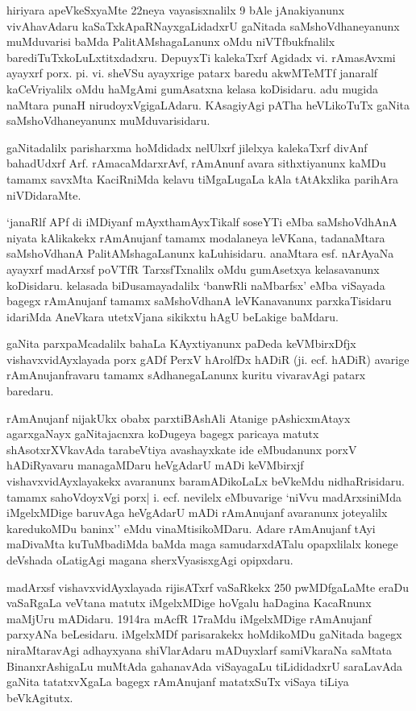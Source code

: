 hiriyara apeVkeSxyaMte {\rm 22}neya vayasisxnalilx {\rm 9} bAle jAnakiyanunx vivAhavAdaru kaSaTxkApaRNayxgaLidadxrU gaNitada saMshoVdhaneyanunx muMduvarisi baMda PalitAMshagaLanunx oMdu niVTfbukfnalilx  barediTuTxkoLuLxtitxdadxru. DepuyxTi kalekaTxrf Agidadx vi. rAmasAvxmi ayayxrf porx. pi. vi. sheVSu ayayxrige patarx baredu akwMTeMTf janaralf kaCeVriyalilx oMdu haMgAmi gumAsatxna kelasa koDisidaru. adu mugida naMtara punaH nirudoyxVgigaLAdaru. KAsagiyAgi pATha heVLikoTuTx gaNita saMshoVdhaneyanunx muMduvarisidaru.

gaNitadalilx parisharxma hoMdidadx nelUlxrf jilelxya kalekaTxrf divAnf bahadUdxrf Arf. rAmacaMdarxrAvf, rAmAnunf avara sithxtiyanunx kaMDu tamamx savxMta KaciRniMda kelavu tiMgaLugaLa kAla tAtAkxlika parihAra niVDidaraMte.

`janaRlf APf di iMDiyanf mAyxthamAyxTikalf soseYTi eMba saMshoVdhAnA niyata kAlikakekx rAmAnujanf tamamx modalaneya leVKana, tadanaMtara saMshoVdhanA PalitAMshagaLanunx kaLuhisidaru. anaMtara esf. nArAyaNa ayayxrf madArxsf poVTfR TarxsfTxnalilx oMdu gumAsetxya kelasavanunx koDisidaru. kelasada biDusamayadalilx `banwRli naMbarfsx' eMba viSayada bagegx rAmAnujanf tamamx saMshoVdhanA leVKanavanunx parxkaTisidaru idariMda AneVkara utetxVjana sikikxtu hAgU beLakige baMdaru.

gaNita parxpaMcadalilx bahaLa KAyxtiyanunx paDeda keVMbirxDfjx vishavxvidAyxlayada porx gADf PerxV hArolfDx hADiR (ji. ecf. hADiR) avarige rAmAnujanfravaru tamamx sAdhanegaLanunx kuritu vivaravAgi patarx baredaru.

rAmAnujanf nijakUkx obabx parxtiBAshAli Atanige pAshicxmAtayx agarxgaNayx gaNitajacnxra koDugeya bagegx paricaya matutx shAsotxrXVkavAda tarabeVtiya avashayxkate ide eMbudanunx porxV hADiRyavaru managaMDaru heVgAdarU mADi keVMbirxjf vishavxvidAyxlayakekx avaranunx baramADikoLaLx beVkeMdu nidhaRrisidaru. tamamx sahoVdoyxVgi porx| i. ecf. nevilelx eMbuvarige `niVvu madArxsiniMda iMgelxMDige baruvAga heVgAdarU mADi rAmAnujanf avaranunx joteyalilx karedukoMDu baninx'' eMdu vinaMtisikoMDaru. Adare rAmAnujanf tAyi maDivaMta kuTuMbadiMda baMda maga samudarxdATalu opapxlilalx konege deVshada oLatigAgi magana sherxVyasisxgAgi opipxdaru.

madArxsf vishavxvidAyxlayada rijisATxrf vaSaRkekx {\rm 250} pwMDfgaLaMte eraDu vaSaRgaLa veVtana matutx iMgelxMDige hoVgalu haDagina KacaRnunx maMjUru mADidaru.  {\rm 1914}ra mAcfR {\rm 17}raMdu iMgelxMDige rAmAnujanf parxyANa beLesidaru. iMgelxMDf parisarakekx hoMdikoMDu gaNitada bagegx niraMtaravAgi adhayxyana shiVlarAdaru mADuyxlarf samiVkaraNa saMtata BinanxrAshigaLu muMtAda gahanavAda viSayagaLu tiLididadxrU saraLavAda gaNita tatatxvXgaLa bagegx rAmAnujanf matatxSuTx viSaya tiLiya beVkAgitutx.

